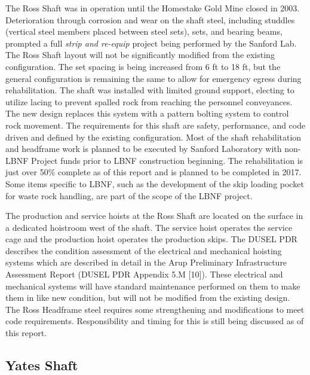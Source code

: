 The Ross Shaft was in operation until the Homestake Gold Mine closed in 2003. Deterioration through corrosion and wear on the shaft steel, including studdles (vertical steel members placed between steel sets), sets, and bearing beams, prompted a full \textit{strip and re-equip} project being performed by the Sanford Lab. The Ross Shaft layout will not be significantly modified from the existing configuration. The set spacing is being increased from 6 ft to 18 ft, but the general configuration is remaining the same to allow for emergency egress during rehabilitation. The shaft was installed with limited ground support, electing to utilize lacing to prevent spalled rock from reaching the personnel conveyances. The new design replaces this system with a pattern bolting system to control rock movement. The requirements for this shaft are safety, performance, and code driven and defined by the existing configuration. Most of the shaft rehabilitation and headframe work is planned to be executed by Sanford Laboratory with non-LBNF Project funds prior to LBNF construction beginning. The rehabilitation is just over 50\% complete as of this report and is planned to be completed in 2017.  Some items specific to LBNF, such as the development of the skip loading pocket for waste rock handling, are part of the scope of the LBNF project.

The production and service hoists at the Ross Shaft are located on the surface in a dedicated hoistroom west of the shaft. The service hoist operates the service cage and the production hoist operates the production skips. The DUSEL PDR describes the condition assessment of the electrical and mechanical hoisting systems which are described in detail in the Arup Preliminary Infrastructure Assessment Report (DUSEL PDR Appendix 5.M [10]). These electrical and mechanical systems will have standard maintenance performed on them to make them in like new condition, but will not be modified from the existing design. The Ross Headframe steel requires some strengthening and modifications to meet code requirements.  Responsibility and timing for this is still being discussed as of this report.

\subsection{Yates Shaft}
\label{sec:fscf-und-shafts-yates}

